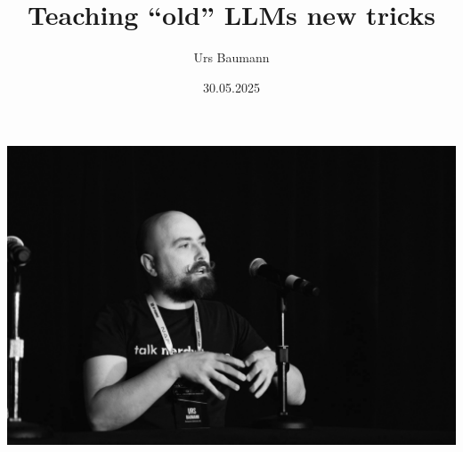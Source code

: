 \documentclass[aspectratio=169]{beamer}
\title{Teaching ``old'' LLMs new tricks}
\author{Urs Baumann}
\date{30.05.2025}
\begin{document}
{
{
  \includegraphics[height=\paperheight]{images/AutoCon_0-108.jpg}
}
\frame{\titlepage}
}




  




\end{document}
